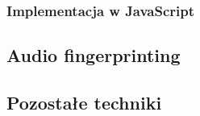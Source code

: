 \subsubsection{Implementacja w JavaScript}

\subsection{Audio fingerprinting}

\subsection{Pozostałe techniki}









